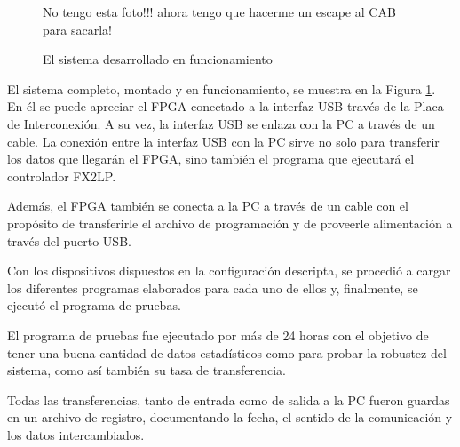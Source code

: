 \begin{figure}[t]
	\centering
	No tengo esta foto!!! ahora tengo que hacerme un escape al CAB para sacarla!
	\caption{El sistema desarrollado en funcionamiento}
	\label{test:todo}
\end{figure}

El sistema completo, montado y en funcionamiento, se muestra en la Figura \ref{test:todo}. En él se puede apreciar el FPGA conectado a la interfaz USB través de la Placa de Interconexión. A su vez, la interfaz USB se enlaza con la PC a través de un cable. La conexión entre la interfaz USB con la PC sirve no solo para transferir los datos que llegarán el FPGA, sino también el programa que ejecutará el controlador FX2LP.

Además, el FPGA también se conecta a la PC a través de un cable con el propósito de transferirle el archivo de programación y de proveerle alimentación a través del puerto USB.

Con los dispositivos dispuestos en la configuración descripta, se procedió a cargar los diferentes programas elaborados para cada uno de ellos y, finalmente, se ejecutó el programa de pruebas.

El programa de pruebas fue ejecutado por más de 24 horas con el objetivo de tener una buena cantidad de datos estadísticos como para probar la robustez del sistema, como así también su tasa de transferencia.

Todas las transferencias, tanto de entrada como de salida a la PC fueron guardas en un archivo de registro, documentando la fecha, el sentido de la comunicación y los datos intercambiados. 